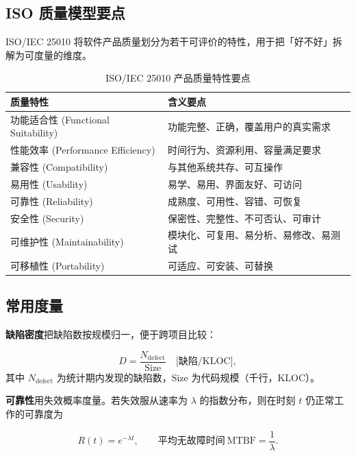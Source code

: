 \subsection{ISO 质量模型要点}

ISO/IEC 25010 将软件产品质量划分为若干可评价的特性，用于把「好不好」拆解为可度量的维度。

\begin{table}[H]
\centering
\caption{ISO/IEC 25010 产品质量特性要点}
\begin{tabulary}{\textwidth}{LL}
\toprule
质量特性 & 含义要点 \\
\midrule
功能适合性 (Functional Suitability) & 功能完整、正确，覆盖用户的真实需求 \\
性能效率 (Performance Efficiency) & 时间行为、资源利用、容量满足要求 \\
兼容性 (Compatibility) & 与其他系统共存、可互操作 \\
易用性 (Usability) & 易学、易用、界面友好、可访问 \\
可靠性 (Reliability) & 成熟度、可用性、容错、可恢复 \\
安全性 (Security) & 保密性、完整性、不可否认、可审计 \\
可维护性 (Maintainability) & 模块化、可复用、易分析、易修改、易测试 \\
可移植性 (Portability) & 可适应、可安装、可替换 \\
\bottomrule
\end{tabulary}
\end{table}

\subsection{常用度量}

\textbf{缺陷密度}把缺陷数按规模归一，便于跨项目比较：

\begin{equation}
    D = \frac{N_{\text{defect}}}{\text{Size}} \quad
    \bigl[\text{缺陷/KLOC}\bigr],
\end{equation}
其中 $N_{\text{defect}}$ 为统计期内发现的缺陷数，$\text{Size}$ 为代码规模（千行，KLOC）。

\textbf{可靠性}用失效概率度量。若失效服从速率为 $\lambda$ 的指数分布，则在时刻 $t$ 仍正常工作的可靠度为

\begin{equation}
    R(t) = e^{-\lambda t}, \qquad \text{平均无故障时间}\ \mathrm{MTBF} = \frac{1}{\lambda}.
\end{equation}

